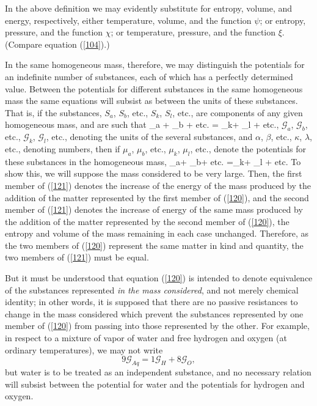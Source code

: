 \documentclass[12pt]{article}
\begin{document}
In the above definition we may evidently substitute for entropy, volume, and energy, respectively, either temperature, volume, and the function $\psi$; or entropy, pressure, and the function $\chi$; or temperature, pressure, and the function $\xi$. (Compare equation (\ref{104}).)



In the same homogeneous mass, therefore, we may distinguish the potentials for an indefinite number of substances, each of which has a perfectly determined value.
Between the potentials for different substances in the same homogeneous mass the same equations will subsist as between the units of these substances.  That is, if the substances, $S_a$, $S_b$, etc., $S_k$, $S_l$, etc., are components of any given homogeneous mass, and are such that
\eqs \alpha {}_a +  \beta {}_b + etc. = \kappa {}_k+ \lambda {}_l + etc.,  \label{120}\eqe
$\mathcal{G}_a$, $\mathcal{G}_b$, etc., $\mathcal{G}_k$, $\mathcal{G}_l$, etc., denoting the units of the several substances, and $\alpha$, $\beta$, etc., $\kappa$, $\lambda$, etc., denoting numbers, then if $\mu_a$, $\mu_b$, etc., $\mu_k$, $\mu_l$, etc., denote the potentials for these substances in the homogeneous mass,
\eqs \alpha \mu_a+ \beta \mu_b+ etc. =\kappa \mu_k+ \lambda 
\mu_l + etc.    \label{121}\eqe
To show this, we will suppose the mass considered to be very large. Then, the first member of (\ref{121}) denotes the increase of the energy of the mass produced by the addition of the matter represented by the first member of (\ref{120}), and the second member of (\ref{121}) denotes the increase of energy of the same mass produced by the addition of the matter represented by the second member of (\ref{120}), the entropy and volume of the mass remaining in each case unchanged. Therefore, as the two members of (\ref{120}) represent the same matter in kind and quantity, the two members of (\ref{121}) must be equal.


But it must be understood that equation (\ref{120}) is intended to denote equivalence of the substances represented \textit{in the mass considered}, and not merely chemical identity; in other words, it is supposed that there are no passive resistances to change in the mass considered which prevent the substances represented by one member of (\ref{120}) from passing into those represented by the other. For example, in respect to a mixture of vapor of water and free hydrogen and oxygen (at ordinary temperatures), we may not write
$$9 \mathcal{G}_{Aq} = 1 \mathcal{G}_H + 8 \mathcal{G}_O,$$
but water is to be treated as an independent substance, and no necessary relation will subsist between the potential for water and the potentials for hydrogen and oxygen.
\end{document}
